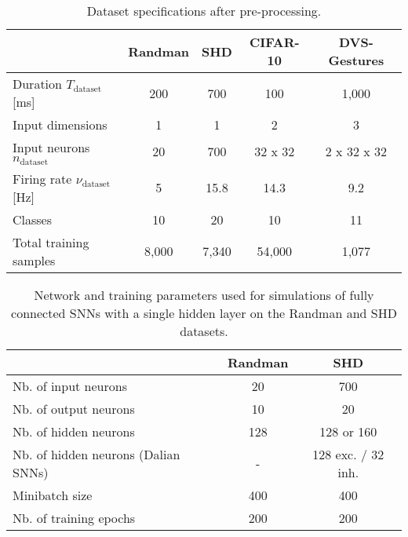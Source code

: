 \documentclass[11pt,a4paper]{article}
\begin{document}
\begin{refsection}
\begin{table}[tpbh]
\setlength{\tabcolsep}{5pt}
\centering
\begin{tabular*}{\textwidth}{@{\extracolsep{\fill}}lcccc}
\hline
 	            					    & Randman 	& SHD 		& CIFAR-10 		& DVS-Gestures 	\\
\hline 
 Duration $T_\text{dataset}$ [ms]   	& 200		& 700		& 100			& 1,000			\\
 Input dimensions		                & 1			& 1			& 2				& 3				\\
 Input neurons $n_\text{dataset}$	    & 20		& 700		& 32 x 32		& 2 x 32 x 32	\\
 Firing rate $\nu_\text{dataset}$ [Hz]  & 5         & 15.8      & 14.3          & 9.2           \\
 Classes		                        & 10		& 20		& 10			& 11			\\
 Total training samples	                & 8,000		& 7,340		& 54,000		& 1,077			\\
\hline
\end{tabular*}
\caption{Dataset specifications after pre-processing.}
\label{stab:datasets}
\end{table}



\begin{table}[htpb]
\setlength{\tabcolsep}{5pt}
\centering
\begin{tabular*}{\textwidth}{@{\extracolsep{\fill}}lcc}
\toprule
 								        & Randman		                    & SHD 		\\
\midrule 
Nb. of input neurons			        & 20				                    & 700		\\
Nb. of output neurons			    & 10				                    	& 20			\\
Nb. of hidden neurons			    & 128                      			& 128 or 160		\\
Nb. of hidden neurons (Dalian \acp{SNN})		& -		        				& 128 exc. / 32 inh.			\\
Minibatch size					        & 400                   				& 400			\\
Nb. of training epochs				    & 200	                    		& 200			\\
\bottomrule
\end{tabular*}
\caption{Network and training parameters used for simulations of fully connected \acp{SNN} with a single hidden layer on the Randman and SHD datasets.}
\label{stab:architecture_shallow}
\end{table}




\end{refsection}
\end{document}

